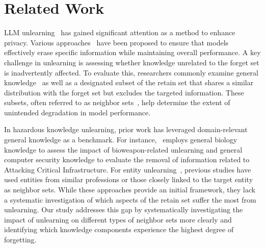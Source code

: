 \section{Related Work}
LLM unlearning~\citep{jang2023knowledgeunlearning, yao2023llmunlearningsurvey, lynch2024eight} has gained significant attention as a method to enhance privacy. Various approaches~\citep{sinha2024unstar, zhang2024npo} have been proposed to ensure that models effectively erase specific information while maintaining overall performance. A key challenge in unlearning is assessing whether knowledge unrelated to the forget set is inadvertently affected. To evaluate this, researchers commonly examine general knowledge~\citep{hendrycks2021measuring, cobbe2021training} as well as a designated subset of the retain set that shares a similar distribution with the forget set but excludes the targeted information. These subsets, often referred to as neighbor sets~\citep{closerlookat}, help determine the extent of unintended degradation in model performance.

In hazardous knowledge unlearning, prior work has leveraged domain-relevant general knowledge as a benchmark. For instance,~\citet{li2024wmdp} employs general biology knowledge to assess the impact of bioweapon-related unlearning and general computer security knowledge to evaluate the removal of information related to Attacking Critical Infrastructure. For entity unlearning~\citep{maini2024tofu, rwku}, previous studies have used entities from similar professions or those closely linked to the target entity as neighbor sets. While these approaches provide an initial framework, they lack a systematic investigation of which aspects of the retain set suffer the most from unlearning. Our study addresses this gap by systematically investigating the impact of unlearning on different types of neighbor sets more clearly and identifying which knowledge components experience the highest degree of forgetting.